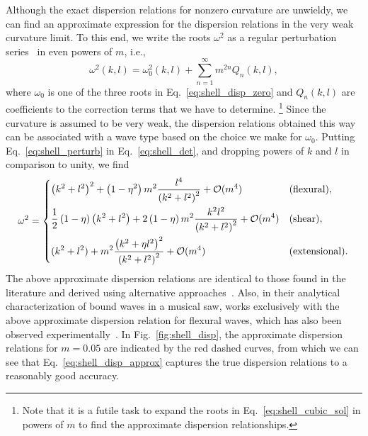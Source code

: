 Although the exact dispersion relations for nonzero curvature are unwieldy, we can find an approximate expression for the dispersion relations in the very weak curvature limit.
To this end, we write the roots $\omega^{2}$ as a regular perturbation series~\cite{bender1978} in even powers of $m$, i.e.,
%
\begin{equation}
  \omega^{2}(k, l) = \omega^{2}_{0}(k, l) + \sum_{n = 1}^{\infty} m^{2n}Q_{n}(k, l),
  \label{eq:shell_perturb}
\end{equation}
%
where $\omega_{0}$ is one of the three roots in Eq.~\eqref{eq:shell_disp_zero} and $Q_{n}(k, l)$ are coefficients to the correction terms that we have to determine.%
\footnote{Note that it is a futile task to expand the roots in Eq.~\eqref{eq:shell_cubic_sol} in powers of $m$ to find the approximate dispersion relationships.}
Since the curvature is assumed to be very weak, the dispersion relations obtained this way can be associated with a wave type based on the choice we make for $\omega_{0}$.
Putting Eq.~\eqref{eq:shell_perturb} in Eq.~\eqref{eq:shell_det}, and dropping powers of $k$ and $l$ in comparison to unity, we find
%
\begin{equation}
  \omega^{2} =
  \begin{dcases}
    \left(k^{2} + l^{2}\right)^{2} + \left(1 - \eta^{2}\right)m^{2}\frac{l^{4}}{\left(k^{2} + l^{2}\right)^{2}} + \mathcal{O}(m^{4}) & \text{(flexural)}, \\
    \frac{1}{2}\left(1-\eta\right)\left(k^{2} + l^{2}\right) + 2\left(1 - \eta\right)m^{2}\frac{k^{2}l^{2}}{\left(k^{2} + l^{2}\right)^{2}} + \mathcal{O}(m^{4}) & \text{(shear)},\\
    (k^{2} + l^{2}) + m^{2}\frac{\left(k^{2} + \eta l^{2}\right)^{2}}{\left(k^{2} + l^{2}\right)^{2}} + \mathcal{O}(m^{4}) & \text{(extensional)}.
  \end{dcases}
  \label{eq:shell_disp_approx}
\end{equation}
%
The above approximate dispersion relations are identical to those found in the literature and derived using alternative approaches~\cite{germogenova1973,pierce1993,norris1994,rebinsky1996}.
Also, in their analytical characterization of bound waves in a musical saw, \citet{shankar2022} works exclusively with the above approximate dispersion relation for flexural waves, which has also been observed experimentally~\cite{williams1990}.
In Fig.~\ref{fig:shell_disp}, the approximate dispersion relations for $m = 0.05$ are indicated by the red dashed curves, from which we can see that Eq.~\eqref{eq:shell_disp_approx} captures the true dispersion relations to a reasonably good accuracy.

